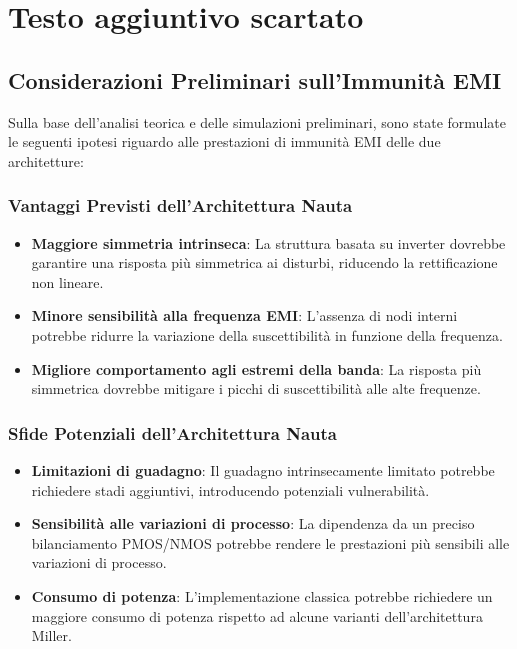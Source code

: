 \section{Testo aggiuntivo scartato}
\subsection{Considerazioni Preliminari sull'Immunità EMI}

Sulla base dell'analisi teorica e delle simulazioni preliminari, sono state formulate le seguenti ipotesi riguardo alle prestazioni di immunità EMI delle due architetture:

\subsubsection{Vantaggi Previsti dell'Architettura Nauta}

\begin{itemize}
    \item \textbf{Maggiore simmetria intrinseca}: La struttura basata su inverter dovrebbe garantire una risposta più simmetrica ai disturbi, riducendo la rettificazione non lineare.
    
    \item \textbf{Minore sensibilità alla frequenza EMI}: L'assenza di nodi interni potrebbe ridurre la variazione della suscettibilità in funzione della frequenza.
    
    \item \textbf{Migliore comportamento agli estremi della banda}: La risposta più simmetrica dovrebbe mitigare i picchi di suscettibilità alle alte frequenze.
\end{itemize}

\subsubsection{Sfide Potenziali dell'Architettura Nauta}

\begin{itemize}
    \item \textbf{Limitazioni di guadagno}: Il guadagno intrinsecamente limitato potrebbe richiedere stadi aggiuntivi, introducendo potenziali vulnerabilità.
    
    \item \textbf{Sensibilità alle variazioni di processo}: La dipendenza da un preciso bilanciamento PMOS/NMOS potrebbe rendere le prestazioni più sensibili alle variazioni di processo.
    
    \item \textbf{Consumo di potenza}: L'implementazione classica potrebbe richiedere un maggiore consumo di potenza rispetto ad alcune varianti dell'architettura Miller.
\end{itemize}

